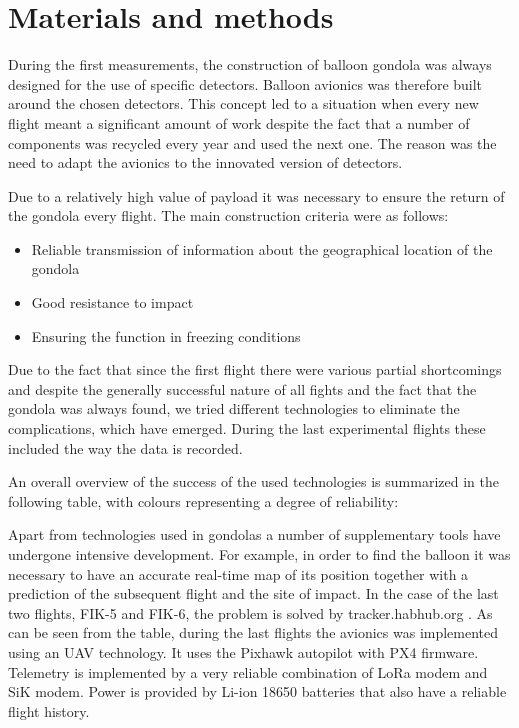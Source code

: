 \documentclass{Rpd}
\begin{document}
\section{Materials and methods}

During the first measurements, the construction of balloon gondola was always designed for the use of specific detectors. Balloon avionics was therefore built around the chosen detectors.
This concept led to a situation when every new flight meant a significant amount of work despite the fact that a number of components was recycled every year and used the next one. The reason was the need to adapt the avionics to the innovated version of detectors.

Due to a relatively high value of payload it was necessary to ensure the return of the gondola every flight. The main construction criteria were as follows:

\begin{itemize}
\item Reliable transmission of information about the geographical location of the gondola 
\item Good resistance to impact
\item Ensuring the function in freezing conditions
\end{itemize}

Due to the fact that since the first flight there were various partial shortcomings and despite the generally successful nature of all fights and the fact that the gondola was always found, we tried different technologies to eliminate the complications, which have emerged. During the last experimental flights these included the way the data is recorded.
 
An overall overview of the success of the used technologies is summarized in the following table, with colours representing a degree of reliability:
 


Apart from technologies used in gondolas a number of supplementary tools have undergone intensive development. For example, in order to find the balloon it was necessary to have an accurate real-time map of its position together with a prediction of the subsequent flight and the site of impact. In the case of the last two flights, FIK-5 and FIK-6, the problem is solved by tracker.habhub.org .
As can be seen from the table, during the last flights the avionics was implemented using an UAV technology. It uses the Pixhawk autopilot with PX4 firmware. Telemetry is implemented by a very reliable combination of LoRa modem and SiK modem. Power is provided by Li-ion 18650 batteries that also have a reliable flight history.
\end{document}
